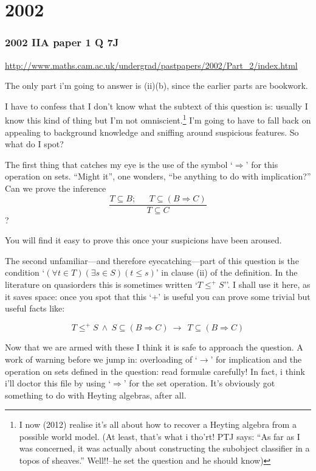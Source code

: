 \documentclass{book}
\begin{document}
\chapter{2002}
\subsection*{2002 IIA paper 1 Q 7J}\label{implication}

\url{http://www.maths.cam.ac.uk/undergrad/pastpapers/2002/Part_2/index.html}



  The only part i'm going to answer is (ii)(b), since the earlier parts
 are bookwork.  
 
 I have to confess that I don't know what the subtext of this question
 is: usually I know this kind of thing but I'm not omniscient.\footnote{I 
now (2012) realise it's all about how to recover a Heyting algebra from a 
possible world model. (At least, that's what i tho'rt! PTJ says: ``As far 
as I was concerned, it was actually about constructing the subobject 
classifier in a topos of sheaves.'' Well!!--he set the question and he should know)} 
I'm going to have to fall back on appealing to background knowledge and
 sniffing around suspicious features.  So what do I spot?
 
 The first thing that catches my eye is the use of the symbol `$\Rightarrow$'
 for this operation on sets.  ``Might it'', one wonders, ``be anything to
 do with implication?''  Can we prove the inference
\begin{equation}\label{three}
\frac{T \subseteq B; \ \ \ \ \ \ \  T \subseteq (B \Rightarrow C)}{T \subseteq C}
\end{equation}?

 You will find it easy to prove this once your suspicions have been aroused.
 
 The second unfamiliar---and therefore eyecatching---part of this
 question is the condition `$(\forall t \in T)(\exists s \in S)(t \leq
 s)$' in clause (ii) of the definition.  In the literature on
 quasiorders this is sometimes written `$T \leq^+ S$''.  I shall use
 it here, as it saves space: once you spot that this `+' is useful you
 can prove some trivial but useful facts like:

\begin{equation}\label{two}
T \leq^+ S\ \wedge\ S \subseteq (B \Rightarrow C) \ \to\ \ T \subseteq (B \Rightarrow C)
\end{equation}

Now that we are armed with these I think it is safe to approach the
question.  A work of warning before we jump in: overloading of `$\to$'
for implication and the operation on sets defined in the question:
read formul{\ae} carefully!   In fact, i think i'll doctor this file 
by using `$\Rightarrow$' for the set operation.  It's obviously got 
something to do with Heyting algebras, after all.
\end{document}
